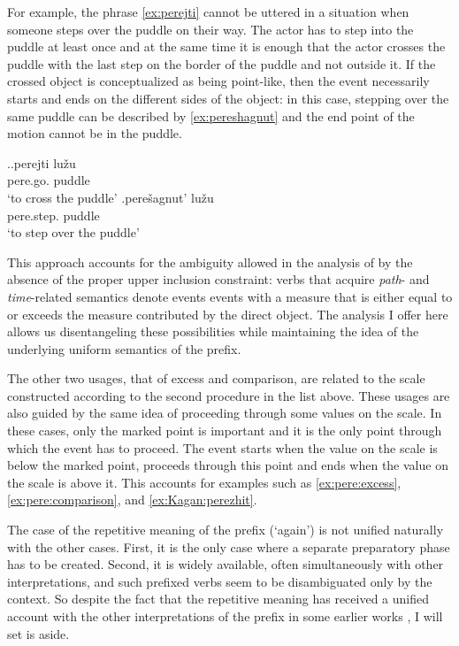 For example, the phrase \ref{ex:perejti} cannot be uttered in a situation when someone steps over the puddle on their way. The actor has to step into the puddle at least once and at the same time it is enough that the actor crosses the puddle with the last step on the border of the puddle and not outside it. If the crossed object is conceptualized as being point-like, then the event necessarily starts and ends on the different sides of the object: in this case, stepping over the same puddle can be described by \ref{ex:pereshagnut} and the end point of the motion cannot be in the puddle.


\ex.\ag.\label{ex:perejti}perejti lu\v{z}u\\
pere.go. puddle\\
\trans `to cross the puddle'
\bg.\label{ex:pereshagnut}pere\v{s}agnut' lu\v{z}u\\
pere.step. puddle\\
\trans `to step over the puddle'

This approach accounts for the ambiguity allowed in the analysis of \citet{Kagan:book} by the absence of the proper upper inclusion constraint: verbs that acquire \textit{path}- and \textit{time}-related semantics denote events events with a measure that is either equal to or exceeds the measure contributed by the direct object. The analysis I offer here allows us disentangeling these possibilities while maintaining the idea of the underlying uniform semantics of the prefix.

The other two usages, that of excess and comparison, are related to the scale constructed according to the second procedure in the list above. These usages are also guided by the same idea of proceeding through some values on the scale. In these cases, only the marked point is important and it is the only point through which the event has to proceed. The event starts when the value on the scale is below the marked point, proceeds through this point and ends when the value on the scale is above it. This accounts for examples such as \ref{ex:pere:excess}, \ref{ex:pere:comparison}, and \ref{ex:Kagan:perezhit}.

The case of the repetitive meaning of the prefix (`again') is not unified naturally with the other cases. First, it is the only case where a separate preparatory phase has to be created. Second, it is widely available, often simultaneously with other interpretations, and such prefixed verbs seem to be disambiguated only by the context. So despite the fact that the repetitive meaning has received a unified account with the other interpretations of the prefix  in some earlier works \citep{Demjjanow:97, Kagan:book}, I will set is aside.

